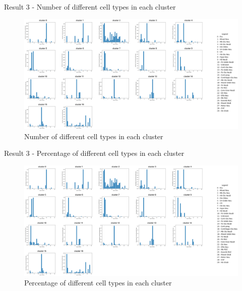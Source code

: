 \documentclass{beamer}
\begin{document}
\begin{frame}{Result 3 - Number of different cell types in each cluster}

\begin{figure}
    \centering
    \includegraphics[width=1\textwidth]{type_num_clusters5.png}
    \caption{Number of different cell types in each cluster}
\end{figure} 

\end{frame}
\begin{frame}{Result 3 - Percentage of different cell types in each cluster}

\begin{figure}
    \centering
    \includegraphics[width=1\textwidth]{type_p_clusters5.png}
    \caption{Percentage of different cell types in each cluster}
\end{figure} 

\end{frame}
\end{document}
